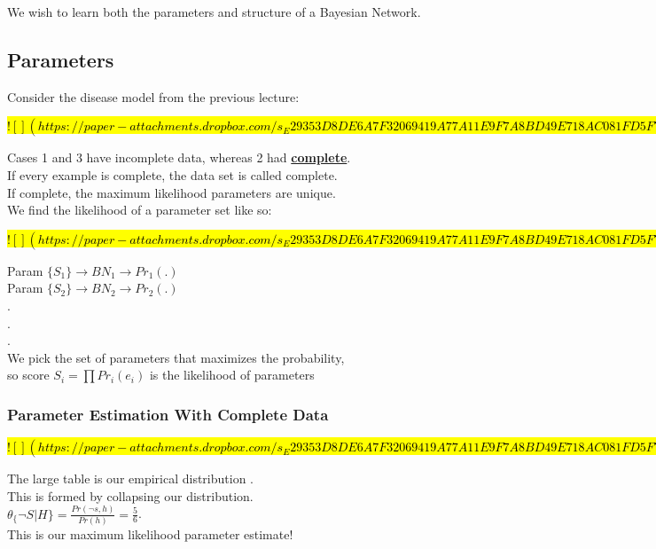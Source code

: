 \documentclass[../../lecture_notes.tex]{subfiles}
\begin{document}
\noindent We wish to learn both the parameters and structure of a Bayesian Network.

\subsection*{Parameters}
\noindent Consider the disease model from the previous lecture:

\hl{
$![](https://paper-attachments.dropbox.com/s_E29353D8DE6A7F32069419A77A11E9F7A8BD49E718AC081FD5F77701FB86FF68_1590905476354_Untitled+drawing.jpg)$
}

\noindent Cases 1 and 3 have incomplete data, whereas 2 had \textbf{\underline{complete}}.\\
If every example is complete, the data set is called complete.\\
If complete, the maximum likelihood parameters are unique.\\
We find the likelihood of a parameter set like so:

\hl{
$![](https://paper-attachments.dropbox.com/s_E29353D8DE6A7F32069419A77A11E9F7A8BD49E718AC081FD5F77701FB86FF68_1590905790509_Untitled+drawing+1.jpg)$
}


\noindent Param $\{S_1\} \rightarrow BN_1 \rightarrow Pr_1(.)$\\
Param $\{S_2\} \rightarrow BN_2 \rightarrow Pr_2(.)$\\
.\\
.\\
.\\
We pick the set of parameters that maximizes the probability,\\
	\indent so score $S_i = \prod Pr_i (e_i)$ is the likelihood of parameters\\


\subsubsection*{Parameter Estimation With Complete Data}

\hl{
$![](https://paper-attachments.dropbox.com/s_E29353D8DE6A7F32069419A77A11E9F7A8BD49E718AC081FD5F77701FB86FF68_1590906656594_Untitled+drawing+2.jpg)$
}

\noindent The large table is our empirical distribution .\\
This is formed by collapsing our distribution.\\
	\indent $\theta_\{\neg S|H\} = \frac{Pr(\neg s,h)}{Pr(h)} = \frac{5}{6}$.\\
This is our maximum likelihood parameter estimate!
\end{document}
